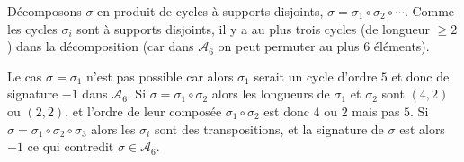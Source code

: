 {\begin{enumerate}
{Décomposons $\sigma$ en produit de cycles à supports disjoints,
$\sigma = \sigma_1 \circ \sigma_2 \circ \cdots$. Comme les cycles
$\sigma_i$ sont à supports disjoints, il y a au plus trois cycles
(de longueur $\geq 2$) dans la décomposition (car dans
$\mathcal{A}_6$ on peut permuter au plus $6$ éléments).
\begin{itemize}
Le cas $\sigma = \sigma_1$ n'est pas possible car alors $\sigma_1$ serait un cycle d'ordre $5$ et donc
de signature $-1$ dans $\mathcal{A}_6$.
Si $\sigma = \sigma_1 \circ \sigma_2$ alors les longueurs de $\sigma_1$
  et $\sigma_2$ sont $(4,2)$ ou $(2,2)$, et l'ordre de leur composée
  $\sigma_1 \circ \sigma_2$ est donc $4$ ou $2$ mais pas $5$.
Si $\sigma = \sigma_1 \circ \sigma_2 \circ \sigma_3$ alors
les $\sigma_i$ sont des transpositions, et la signature de
$\sigma$ est alors $-1$ ce qui contredit $\sigma \in
\mathcal{A}_6$.
\end{itemize}
}
\end{enumerate}
}
